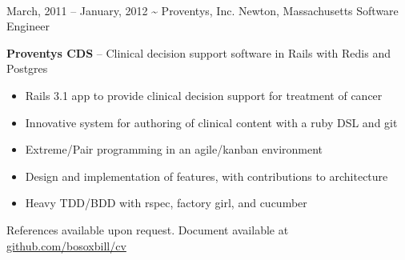 \documentclass[]{friggeri-cv}
\begin{document}
\begin{entrylist}
    \\[0.8cm]%
    \entryalt
    {March, 2011 -- January, 2012}
    {\textbf{\textasciitilde} Proventys, Inc.}
    {Newton, Massachusetts}
    {Software Engineer}
    {\textbf{Proventys CDS} -- Clinical decision support software in Rails with Redis and Postgres
    \begin{itemize}
      \item Rails 3.1 app to provide clinical decision support for treatment of cancer
      \item Innovative system for authoring of clinical content with a ruby DSL and git
      \item Extreme/Pair programming in an agile/kanban environment
      \item Design and implementation of features, with contributions to architecture
      \item Heavy TDD/BDD with rspec, factory girl, and cucumber
    \end{itemize}}
\end{entrylist} 

\vspace*{\fill}
References available upon request. Document available at \href{http://github.com/bosoxbill/cv/}{github.com/bosoxbill/cv}
\end{document}
